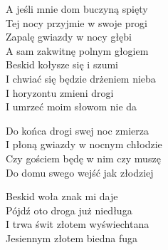 
\begin{text}
    A jeśli mnie dom buczyną spięty\\
    Tej nocy przyjmie w swoje progi\\
    Zapalę gwiazdy w nocy głębi\\
    A sam zakwitnę polnym głogiem\\

    Beskid kołysze się i szumi\\
    I chwiać się będzie drżeniem nieba\\
    I horyzontu zmieni drogi\\
    I umrzeć moim słowom nie da

    Do końca drogi swej noc zmierza\\
    I płoną gwiazdy w nocnym chłodzie\\
    Czy gościem będę w nim czy muszę\\
    Do domu swego wejść jak złodziej

    Beskid woła znak mi daje\\
    Pójdź oto droga już niedługa\\
    I trwa świt złotem wyświechtana\\
    Jesiennym złotem biedna fuga
\end{text}
\begin{chord}

\end{chord}